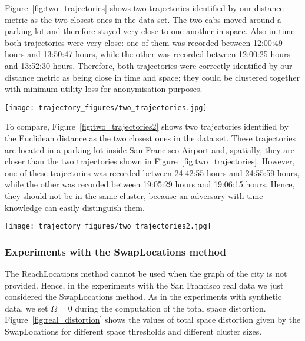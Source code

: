 Figure~\ref{fig:two_trajectories} shows two trajectories identified by
our distance metric as the two closest ones in the data set.
The two cabs moved around a parking lot and therefore stayed very
close to one another in space. Also in time both trajectories were very close:
one of them was recorded between 12:00:49 hours and 13:50:47
hours, while the other was recorded between 12:00:25 hours and 13:52:30 hours.
Therefore, both trajectories were correctly identified
by our distance metric as being close in time and space; they
could be clustered together with minimum utility loss for anonymisation
purposes.

\begin{figure*}[p]
\centering
\texttt{[image: trajectory\_figures/two\_trajectories.jpg]}
\caption{The two closest trajectories in the real-life data set
according to our distance metric}
\label{fig:two_trajectories}
\end{figure*}

To compare, Figure~\ref{fig:two_trajectories2} shows two trajectories
identified by the Euclidean distance as the two closest ones in the data set.
These trajectories are located in a parking lot inside
San Francisco Airport and,
spatially, they are closer than the two trajectories shown
in Figure~\ref{fig:two_trajectories}. However, one of these trajectories
was recorded between 24:42:55 hours and 24:55:59 hours, while the other
was recorded between 19:05:29 hours and 19:06:15 hours. Hence, they
should not be
in the same cluster, because an adversary with time knowledge can easily
distinguish them.

\begin{figure*}[p]
\centering
\texttt{[image: trajectory\_figures/two\_trajectories2.jpg]}
\caption{The two closest trajectories in the real-life data set
according to the Euclidean distance}
\label{fig:two_trajectories2}
\end{figure*}



\subsubsection{Experiments with the SwapLocations method}

The ReachLocations method cannot be used when the graph of the
city is not provided. Hence, in the experiments with
the San Francisco real data we just considered the SwapLocations method.
As in the experiments with synthetic data, we set $\Omega = 0$
during the computation of the total space distortion.
Figure~\ref{fig:real_distortion} shows the values of total space
distortion given by the SwapLocations for different space thresholds
and different cluster sizes.

